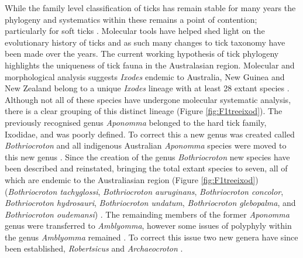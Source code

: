 \documentclass[a4paper, nobind]{templates/ociamthesis}
\begin{document}
While the family level classification of ticks has remain stable for many years the phylogeny and systematics within these remains a point of contention; particularly for soft ticks \autocite{mansArgasidIxodidSystematics2019}.
Molecular tools have helped shed light on the evolutionary history of ticks and as such many changes to tick taxonomy have been made over the years.
The current working hypothesis of tick phylogeny highlights the uniqueness of tick fauna in the Australasian region.
Molecular and morphological analysis suggests \emph{Ixodes} endemic to Australia, New Guinea and New Zealand belong to a unique \emph{Ixodes} lineage with at least 28 extant species \autocite{barkerSystematicsEvolutionTicks2004}.
Although not all of these species have undergone molecular systematic analysis, there is a clear grouping of this distinct lineage (Figure \ref{fig:F1treeixod}).
The previously recognised genus \emph{Aponomma} belonged to the hard tick family, Ixodidae, and was poorly defined.
To correct this a new genus was created called \emph{Bothriocroton} and all indigenous Australian \emph{Aponomma} species were moved to this new genus \autocite{keiransAponommaBothriocrotonGlebopalma1994,klompenNewSubfamilyBothriocrotoninae2002}.
Since the creation of the genus \emph{Bothriocroton} new species have been described and reinstated, bringing the total extant species to seven, all of which are endemic to the Australiasian region (Figure \ref{fig:F1treeixod}) (\emph{Bothriocroton tachyglossi}, \emph{Bothriocroton auruginans}, \emph{Bothriocroton concolor}, \emph{Bothriocroton hydrosauri}, \emph{Bothriocroton undatum}, \emph{Bothriocroton glebopalma}, and \emph{Bothriocroton oudemansi}) \autocite{keiransAponommaBothriocrotonGlebopalma1994,klompenNewSubfamilyBothriocrotoninae2002,andrewsSystematicStatusAponomma2006,beatiBothriocrotonOudemansiNeumann2008}.
The remainding members of the former \emph{Aponomma} genus were transferred to \emph{Amblyomma}, however some issues of polyphyly within the genus \emph{Amblyomma} remained \autocite{burgerPhylogeneticAnalysisTicks2012,burgerPhylogeneticAnalysisMitochondrial2013}.
To correct this issue two new genera have since been established, \emph{Robertsicus} and \emph{Archaeocroton} \autocite{barkerTwoNewGenera2018}.
\end{document}
